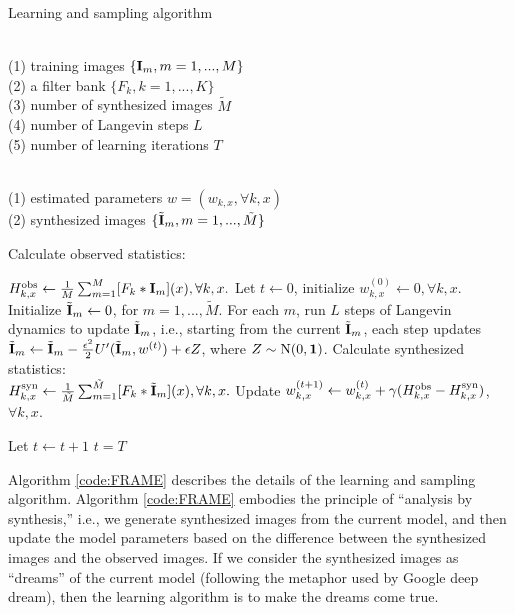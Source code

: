 \documentclass[letterpaper]{article}
\def\I{{\bf I}}
\def\tI{\tilde{\bf I}}
\def\obs{{\rm obs}}
\def\syn{{\rm syn}}
\begin{document}
\begin{algorithm}
\caption{Learning and sampling algorithm}
\label{code:FRAME}
\begin{algorithmic}[1]

\REQUIRE ~~\\
(1)  training images $\{\I_m, m=1,...,M\}$ \\
(2) a filter bank $\{F_{k},  k = 1, ..., K\}$\\
(3) number of synthesized images $\tilde{M}$\\
(4) number of Langevin steps $L$\\
(5) number of learning iterations $T$

\ENSURE~~\\
(1) estimated parameters $w=(w_{k, x}, \forall k, x)$\\
(2) synthesized images $\{\tI_m, m = 1, ..., \tilde{M}\}$ 

\item[] 
\STATE Calculate observed statistics:

$H^{\obs}_{k, x} \leftarrow \frac{1}{M}\sum_{m=1}^{M} [F_k*\I_m](x), \forall k, x.$ 
\STATE Let $t\leftarrow 0$, initialize $w^{(0)}_{k, x} \leftarrow 0, \forall k, x$.
\STATE Initialize $\tI_m \leftarrow 0$, for $m = 1, ..., \tilde{M}$. 
\REPEAT 
\STATE For each $m$, run $L$ steps of Langevin dynamics to update $\tI_m$, i.e., starting from the current $\tI_m$, each step updates
$ \tI_{m} \leftarrow \tI_{m} - \frac{\epsilon^2}{2} U'(\tI_m, w^{(t)}) + \epsilon Z$,  
where $Z \sim {\rm N}(0, {\bf 1})$. 
\STATE Calculate synthesized statistics:\\
$H^{\syn}_{k, x} \leftarrow \frac{1}{\tilde{M}}\sum_{m=1}^{\tilde{M}} [F_k*\tI_m](x), \forall k, x.$
\STATE Update $w^{(t+1)}_{k, x} \leftarrow w^{(t)}_{k, x}+ \gamma ( H^{\obs}_{k, x} - H^{\syn}_{k, x}) $, $\forall k, x$.

\STATE Let $t \leftarrow t+1$
\UNTIL $t = T$
\end{algorithmic}
\end{algorithm}


Algorithm \ref{code:FRAME} describes the details of the learning and sampling algorithm.  Algorithm \ref{code:FRAME} embodies the principle of ``analysis by synthesis,''  i.e., we generate synthesized images from the current model, and then update the model parameters based on the difference between the synthesized images and the observed images. If we consider the synthesized images as ``dreams'' of the current model (following the metaphor used by Google deep dream), then the learning algorithm is to make the dreams come true. 
\end{document}
